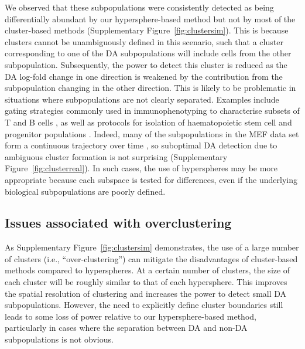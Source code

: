 \documentclass{article}
\begin{document}
We observed that these subpopulations were consistently detected as being differentially abundant by our hypersphere-based method but not by most of the cluster-based methods (Supplementary Figure~\ref{fig:clustersim}).
This is because clusters cannot be unambiguously defined in this scenario, such that a cluster corresponding to one of the DA subpopulations will include cells from the other subpopulation.
Subsequently, the power to detect this cluster is reduced as the DA log-fold change in one direction is weakened by the contribution from the subpopulation changing in the other direction.
This is likely to be problematic in situations where subpopulations are not clearly separated.
Examples include gating strategies commonly used in immunophenotyping to characterise subsets of T and B cells \cite{finak2016standardizing}, as well as protocols for isolation of haematopoietic stem cell and progenitor populations \cite{wilson2015combined}.
Indeed, many of the subpopulations in the MEF data set form a continuous trajectory over time \cite{zunder2015continuous}, so suboptimal DA detection due to ambiguous cluster formation is not surprising (Supplementary Figure~\ref{fig:clusterreal}).
In such cases, the use of hyperspheres may be more appropriate because each subspace is tested for differences, even if the underlying biological subpopulations are poorly defined.


\subsection{Issues associated with overclustering}
As Supplementary Figure~\ref{fig:clustersim} demonstrates, the use of a large number of clusters (i.e., ``over-clustering'') can mitigate the disadvantages of cluster-based methods compared to hyperspheres.
At a certain number of clusters, the size of each cluster will be roughly similar to that of each hypersphere.
This improves the spatial resolution of clustering and increases the power to detect small DA subpopulations.
However, the need to explicitly define cluster boundaries still leads to some loss of power relative to our hypersphere-based method, particularly in cases where the separation between DA and non-DA subpopulations is not obvious.
\end{document}
